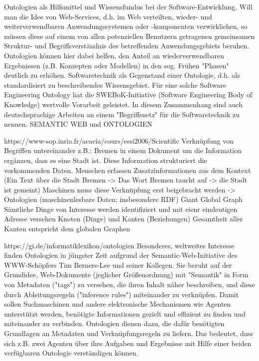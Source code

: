 Ontologien als Hilfsmittel und Wissensfundus bei der Software-Entwicklung. Will man die Idee von Web-Services, d.h. im Web verteilten, wieder- und weiterverwendbaren Anwendungssystemen oder -komponenten verwirklichen, so müssen diese auf einem von allen potenziellen Benutzern getragenen gemeinsamen Struktur- und Begriffsverständnis des betreffenden Anwendungsgebiets beruhen. 
Ontologien können hier dabei helfen, den Anteil an wiederverwendbaren Ergebnissen (z.B. Konzepten oder Modellen) in den sog. Frühen "Phasen" deutlich zu erhöhen.
Softwaretechnik als Gegenstand einer Ontologie, d.h. als standardisiert zu beschreibendes Wissensgebiet. Für eine solche Software Engineering Ontology hat die SWEBoK-Initiative (Software Engineering Body of Knowledge) wertvolle Vorarbeit geleistet. In diesem Zusammenhang sind auch deutschsprachige Arbeiten an einem "Begriffsnetz" für die Softwaretechnik zu nennen.
SEMANTIC WEB und ONTOLOGIEN 


https://www-sop.inria.fr/acacia/cours/essi2006/Scientific%
	Verknüpfung von Begriffen untereinander
		z.B.: Bremen in einem Dokument um die Information ergänzen, dass es eine Stadt ist. Diese Information strukturiert die vorkommenden Daten. 
		Menschen erfassen Zusatzinformationen aus dem Kontext (Ein Text über die Stadt Bremen -> Das Wort Bremen taucht auf -> die Stadt ist gemeint)
		Maschinen muss diese Verknüpfung erst beigebracht werden -> Ontologien (maschinenlesbare Daten; insbesondere RDF)
	Giant Global Graph
		Sämtliche Dinge von Interesse werden identifiziert und mit eienr eindeutigen Adresse versehen
		Knoten (Dinge) und Kanten (Beziehungen) 
		Gesamtheit aller Kanten entspricht dem globalen Graphen

		https://gi.de/informatiklexikon/ontologien
Besonderes, weltweites Interesse finden Ontologien in jüngster Zeit aufgrund der Semantic-Web-Initiative des WWW-Schöpfers Tim Berners-Lee und seiner Kollegen. Sie beruht auf der Grundidee, Web-Dokumente (jeglicher Größenordnung) mit "Semantik" in Form von Metadaten ("tags") zu versehen, die ihren Inhalt näher beschreiben, und diese durch Ableitungsregeln ("inference rules") miteinander zu verknüpfen. Damit sollen Suchmaschinen und andere elektronische Mechanismen wie Agenten unterstützt werden, benötigte Informationen gezielt und effizient zu finden und miteinander zu verbinden. Ontologien dienen dazu, die dafür benötigten Grundlagen an Metadaten und Verknüpfungsregeln zu liefern. Das bedeutet, dass sich z.B. zwei Agenten über ihre Aufgaben und Ergebnisse mit Hilfe einer beiden verfügbaren Ontologie verständigen können.